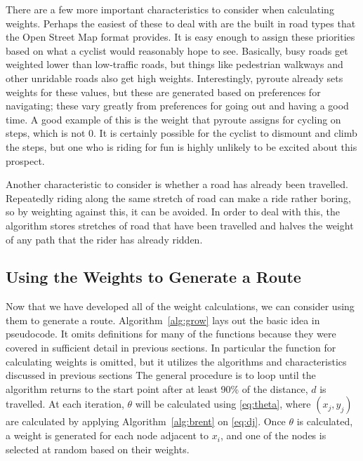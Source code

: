 \documentclass[twocolumn,12pt]{article}
\begin{document}
There are a few more important characteristics to consider when calculating
weights. Perhaps the easiest of these to deal with are the built in road types
that the Open Street Map format provides. It is easy enough to assign these
priorities based on what a cyclist would reasonably hope to see. Basically,
busy roads get weighted lower than low-traffic roads, but things like
pedestrian walkways and other unridable roads also get high weights.
Interestingly, pyroute already sets weights for these values, but these are
generated based on preferences for navigating; these vary greatly from
preferences for going out and having a good time. A good example of this is the
weight that pyroute assigns for cycling on steps, which is not 0. It is
certainly possible for the cyclist to dismount and climb the steps, but one who
is riding for fun is highly unlikely to be excited about this prospect.

Another characteristic to consider is whether a road has already been
travelled. Repeatedly riding along the same stretch of road can make a ride
rather boring, so by weighting against this, it can be avoided. In order to deal
with this, the algorithm stores stretches of road that have been travelled and
halves the weight of any path that the rider has already ridden.

\subsection{Using the Weights to Generate a Route}

Now that we have developed all of the weight calculations, we can consider using
them to generate a route. Algorithm~\ref{alg:grow} lays out the basic idea in
pseudocode. It omits definitions for many of the functions because they were
covered in sufficient detail in previous sections. In particular the function
for calculating weights is omitted, but it utilizes the algorithms and
characteristics discussed in previous sections
The general procedure is
to loop until the algorithm returns to the start point after at least 90\%
of the distance, $d$ is travelled. At each iteration, $\theta$ will be
calculated using \eqref{eq:theta}, where $(x_j,y_j)$ are calculated by applying
Algorithm~\ref{alg:brent} on \eqref{eq:dj}. Once $\theta$ is calculated, a
weight is generated for each node adjacent to $x_i$, and one of the nodes is
selected at random based on their weights.
\end{document}
